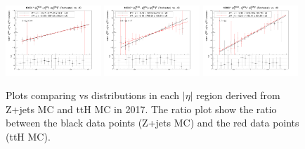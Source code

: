 \begin{figure}[h!]
    \centering
    \includegraphics[width=0.32\textwidth]{images_geofit/ttH_eta_0_0p9_2017.png}
    \includegraphics[width=0.32\textwidth]{images_geofit/ttH_eta_0p9_1p7_2017.png}
    \includegraphics[width=0.32\textwidth]{images_geofit/ttH_eta_1p7_inf_2017.png}
    \caption{Plots comparing \dptoverptsquare vs \dzeroBS distributions in each $|\eta|$ region derived from Z+jets MC and ttH MC in 2017. The ratio plot show the ratio between the black data points (Z+jets MC) and the red data points (ttH MC).}
    \label{fig:ttH_d0_2017}
\end{figure}

